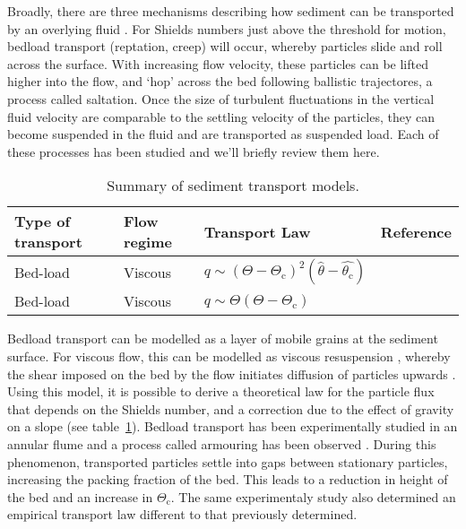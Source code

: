 \documentclass[12pt]{article}
\begin{document}
Broadly, there are three mechanisms describing how sediment can be transported by an overlying fluid \citep{Bagnold41}. For Shields numbers just above the threshold for motion, bedload transport (reptation, creep) will occur, whereby particles slide and roll across the surface. With increasing flow velocity, these particles can be lifted higher into the flow, and `hop' across the bed following ballistic trajectores, a process called saltation. Once the size of turbulent fluctuations in the vertical fluid velocity are comparable to the settling velocity of the particles, they can become suspended in the fluid and are transported as suspended load. Each of these processes has been studied and we'll briefly review them here.

\begin{table}
\begin{center}
\caption{Summary of sediment transport models. \label{tab:sed_trans}}
\begin{tabular}{|p{}|p{}|p{}|p{}|}
    \hline
    Type of transport & Flow regime & Transport Law & Reference  \\
    \hline
    Bed-load & Viscous & $q \sim (\Theta - \Theta_{\text{c}})^{2}(\hat{\theta} - \hat{\theta_{\text{c}}})$ & \citep{Charru02} \\
    Bed-load & Viscous & $q \sim \Theta(\Theta - \Theta_{\text{c}})$ & \citep{Charru04} \\
    \hline
\end{tabular}
\end{center}
\end{table}

Bedload transport can be modelled as a layer of mobile grains at the sediment surface. For viscous flow, this can be modelled as viscous resuspension \citep{Leighton86}, whereby the shear imposed on the bed by the flow initiates diffusion of particles upwards \citep{Leighton87}. Using this model, it is possible to derive a theoretical law for the particle flux that depends on the Shields number, and a correction due to the effect of gravity on a slope \citep{Charru02} (see table~\ref{tab:sed_trans}). Bedload transport has been experimentally studied in an annular flume and a process called armouring has been observed \citep{Charru04}. During this phenomenon, transported particles settle into gaps between stationary particles, increasing the packing fraction of the bed. This leads to a reduction in height of the bed and an increase in $\Theta_{\text{c}}$. The same experimentaly study also determined an empirical transport law different to that previously determined. 
\end{document}
